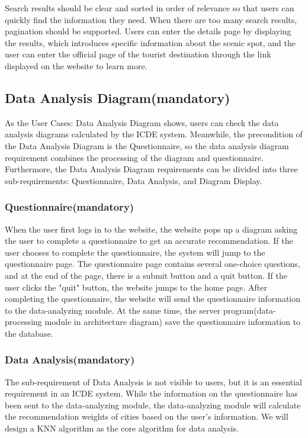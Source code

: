 \documentclass[conference]{IEEEtran}
\begin{document}
Search results should be clear and sorted in order of relevance so that 
users can quickly find the information they need. When there are too many 
search results, pagination should be supported. Users can enter the details 
page by displaying the results, which introduces specific information about 
the scenic spot, and the user can enter the official page of the tourist 
destination through the link displayed on the website to learn more.

\subsection{ Data Analysis Diagram(mandatory) }

As the User Cases: Data Analysis Diagram shows, users can check the 
data analysis diagrams calculated by the ICDE system. Meanwhile, the precondition of the Data Analysis Diagram is the Questionnaire, 
so the data analysis diagram requirement combines the processing of the diagram and questionnaire. Furthermore, the Data Analysis
Diagram requirements can be divided into three sub-requirements: Questionnaire, Data Analysis, and Diagram Display.

\subsubsection{ Questionnaire(mandatory) }

When the user first logs in to the website, the website pops up a diagram asking the user to complete a questionnaire to 
get an accurate recommendation. If the user chooses 
to complete the questionnaire, the system will jump to the questionnaire page. The questionnaire page contains several one-choice questions, and
at the end of the page, there is a submit button and a quit button. If the user clicks the "quit" button, the website jumps to the home page.
After completing the questionnaire, the website will send the 
questionnaire information to the data-analyzing module. At the same time, the server program(data-processing module in architecture diagram) 
save the questionnaire information to the database.

\subsubsection{ Data Analysis(mandatory) }

The sub-requirement of Data Analysis is not visible to users, but it is an essential requirement in an ICDE system. While the information on the questionnaire has been sent to
the data-analyzing module, the data-analyzing module will calculate the recommendation weights of cities based on the user's information. We will design a KNN algorithm as the core 
algorithm for data analysis.  
\end{document}
